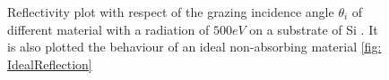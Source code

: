 \begin{figure}[]
%
\caption{Reflectivity plot with respect of the grazing incidence angle $\theta_i $ of different material with a radiation of $500 eV$ on a substrate of Si \cite{CXRO}. It is also plotted the behaviour of an ideal non-absorbing material \ref{fig: IdealReflection}}
\label{fig : Plottts}
%
\end{figure}